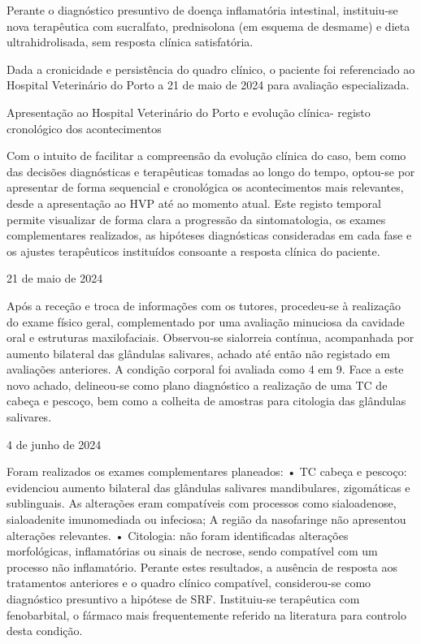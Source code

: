Perante o diagnóstico presuntivo de doença inflamatória intestinal, instituiu-se nova terapêutica com sucralfato, prednisolona (em esquema de desmame) e dieta ultrahidrolisada, sem resposta clínica satisfatória.


Dada a cronicidade e persistência do quadro clínico, o paciente foi referenciado ao Hospital Veterinário do Porto a 21 de maio de 2024 para avaliação especializada.


Apresentação ao Hospital Veterinário do Porto e evolução clínica- registo cronológico dos acontecimentos


Com o intuito de facilitar a compreensão da evolução clínica do caso, bem como das decisões diagnósticas e terapêuticas tomadas ao longo do tempo, optou-se por apresentar de forma sequencial e cronológica os acontecimentos mais relevantes, desde a apresentação ao HVP até ao momento atual. Este registo temporal permite visualizar de forma clara a progressão da sintomatologia, os exames complementares realizados, as hipóteses diagnósticas consideradas em cada fase e os ajustes terapêuticos instituídos consoante a resposta clínica do paciente.

21 de maio de 2024


Após a receção e troca de informações com os tutores, procedeu-se à realização do exame físico geral, complementado por uma avaliação minuciosa da cavidade oral e estruturas maxilofaciais. Observou-se sialorreia contínua, acompanhada por aumento bilateral das glândulas salivares, achado até então não registado em avaliações anteriores. A condição corporal foi avaliada como 4 em 9. 
Face a este novo achado, delineou-se como plano diagnóstico a realização de uma TC de cabeça e pescoço, bem como a colheita de amostras para citologia das glândulas salivares.


4 de junho de 2024


Foram realizados os exames complementares planeados:
•	TC cabeça e pescoço: evidenciou aumento bilateral das glândulas salivares mandibulares, zigomáticas e sublinguais. As alterações eram compatíveis com processos como sialoadenose, sialoadenite imunomediada ou infeciosa; A região da nasofaringe não apresentou alterações relevantes.
•	Citologia: não foram identificadas alterações morfológicas, inflamatórias ou sinais de necrose, sendo compatível com um processo não inflamatório.
Perante estes resultados, a ausência de resposta aos tratamentos anteriores e o quadro clínico compatível, considerou-se como diagnóstico presuntivo a hipótese de SRF. Instituiu-se terapêutica com fenobarbital, o fármaco mais frequentemente referido na literatura para controlo desta condição.



